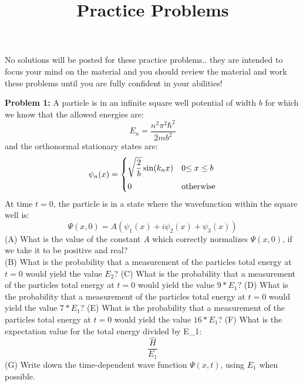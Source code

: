 \documentclass[12pt]{article}
\begin{document}
\newcommand{\ihbar}{\ensuremath{i \hbar}}
\newcommand{\dPsidt}{\ensuremath{ \frac{\partial \Psi}{\partial t} }}
\newcommand{\dPsidx}{\ensuremath{ \frac{\partial \Psi}{\partial x} }}
\newcommand{\ddPsidx}{\ensuremath{ \frac{\partial^2 \Psi}{\partial x^2} }}
\newcommand{\dPssdt}{\ensuremath{ \frac{\partial \Psi^*}{\partial t} }}
\newcommand{\dPssdx}{\ensuremath{ \frac{\partial \Psi^*}{\partial x} }}
\newcommand{\ddPssdx}{\ensuremath{ \frac{\partial^2 \Psi^*}{\partial x^2} }}

\newcommand{\dphidt}{\ensuremath{ \frac{d \phi}{dt} }}
\newcommand{\dpsidx}{\ensuremath{ \frac{d \psi}{dx} }}
\newcommand{\ddpsidx}{\ensuremath{ \frac{d^2 \psi}{dx^2} }}


\date{\vspace{-5ex}}

\title{Practice Problems}

\maketitle

No solutions will be posted for these practice problems.. they are
intended to focus your mind on the material and you should review the
material and work these problems until you are fully confident in your
abilities!

\noindent
{\bf Problem 1:}
A particle is in an infinite square well potential of width $b$ for which we know that the allowed energies are:
$$E_n = \frac{n^2 \pi^2 \hbar^2}{2mb^2}$$
and the orthonormal stationary states are:
$$
\psi_n(x) = 
\begin{cases}    
   {\displaystyle \sqrt{\frac{2}{b}}\sin(k_n x)} & 0 {\displaystyle \leq x \leq b} \\[8pt]
   0 & {\rm otherwise} \\
\end{cases}   
$$
At time $t=0$, the particle is in a state where the wavefunction within the square well is:
$$\Psi(x,0) = A\left( \psi_1(x) + i\psi_2(x) + \psi_3(x) \right)$$
\noindent
(A) What is the value of the constant $A$ which correctly normalizes $\Psi(x,0)$, if we take it to be positive and real?\\[5pt]
(B) What is the probability that a measurement of the particles total energy at $t=0$ would yield the value $E_2$?
(C) What is the probability that a measurement of the particles total energy at $t=0$ would yield the value $9*E_1$?
(D) What is the probability that a measurement of the particles total energy at $t=0$ would yield the value $7*E_1$?
(E) What is the probability that a measurement of the particles total energy at $t=0$ would yield the value $16*E_1$?
(F) What is the expectation value for the total energy divided by E_1:
$$\frac{\hat{H}}{E_1}$$
(G) Write down the time-dependent wave function $\Psi(x,t)$, using $E_1$ when possible. 
\end{document}
